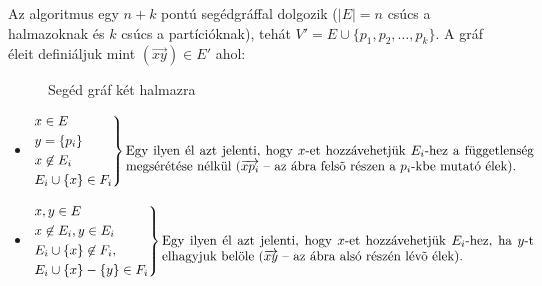 Az algoritmus egy $n+k$ pontú segédgráffal dolgozik ($|E|=n$ csúcs a halmazoknak
és $k$ csúcs a partícióknak), tehát $V' = E \cup \{p_1, p_2, \ldots, p_k\}$. A
gráf éleit definiáljuk mint $(\overrightarrow{xy}) \in E'$ ahol:

\begin{figure}[htbp]
\caption{Segéd gráf két halmazra}
\label{fig:MPP_graf}
\centering {} 
\end{figure}


\begin{itemize}
  \item  $\begin{rcases}
  x \in E \\
  y = \{ p_i \}  \\
  x \not \in E_i\\
  E_i \cup  \{x\}  \in  F_i \end{rcases}
  \parbox[t]{11cm}{Egy ilyen él azt jelenti, hogy $x$-et hozzávehetjük $E_i$-hez
   a függetlenség megsérétése nélkül ($\overrightarrow{xp_i}$ -- az ábra felsõ
  részen a $p_i$-kbe mutató élek).}$
  \item $\begin{rcases}
  x,y \in E \\
  x \not\in E_i, y \in E_i\\
   E_i \cup \{x\} \not\in F_i,\\ 
   E_i \cup \{x\} - \{y\} \in F_i
  \end{rcases} \parbox[t]{10cm}{Egy ilyen él azt jelenti, hogy $x$-et
  hozzávehetjük $E_i$-hez, ha $y$-t elhagyjuk belöle ($\overrightarrow{xy}$ --
  az ábra alsó részén lévõ élek).}$
\end{itemize}

